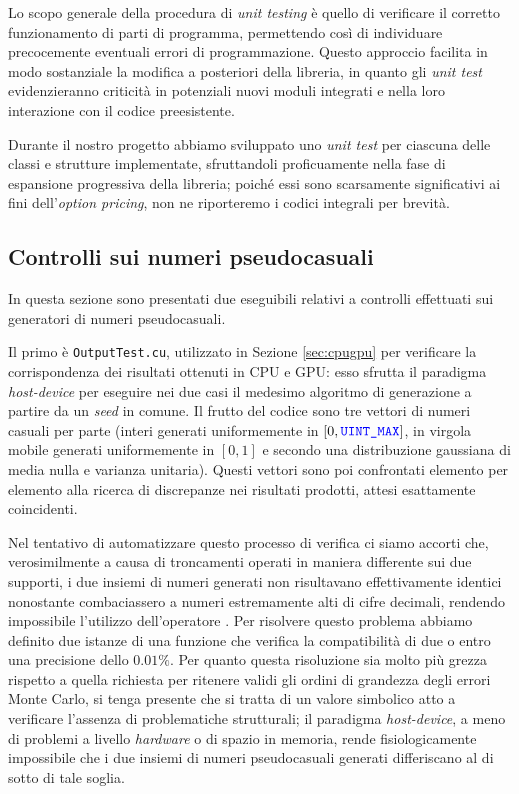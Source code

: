 Lo scopo generale della procedura di \textit{unit testing} è quello di verificare il corretto funzionamento di parti di programma, permettendo così di individuare precocemente eventuali errori di programmazione. Questo approccio facilita in modo sostanziale la modifica a posteriori della libreria, in quanto gli \textit{unit test} evidenzieranno criticità in potenziali nuovi moduli integrati e nella loro interazione con il codice preesistente.

Durante il nostro progetto abbiamo sviluppato uno \textit{unit test} per ciascuna delle classi e strutture implementate, sfruttandoli proficuamente nella fase di espansione progressiva della libreria; poiché essi sono scarsamente significativi ai fini dell'\textit{option pricing}, non ne riporteremo i codici integrali per brevità.

\subsection{Controlli sui numeri pseudocasuali}
In questa sezione sono presentati due eseguibili relativi a controlli effettuati sui generatori di numeri pseudocasuali.

Il primo è \verb|OutputTest.cu|, utilizzato in Sezione \ref{sec:cpugpu} per verificare la corrispondenza dei risultati ottenuti in CPU e GPU: esso sfrutta il paradigma \textit{host-device} per eseguire nei due casi il medesimo algoritmo di generazione a partire da un \textit{seed} in comune. Il frutto del codice sono tre vettori di numeri casuali per parte (interi generati uniformemente in $[0,\codeword{UINT_MAX}]$, in virgola mobile generati uniformemente in $[0,1]$ e secondo una distribuzione gaussiana di media nulla e varianza unitaria). Questi vettori sono poi confrontati elemento per elemento alla ricerca di discrepanze nei risultati prodotti, attesi esattamente coincidenti.

Nel tentativo di automatizzare questo processo di verifica ci siamo accorti che, verosimilmente a causa di troncamenti operati in maniera differente sui due supporti, i due insiemi di numeri generati non risultavano effettivamente identici nonostante combaciassero a numeri estremamente alti di cifre decimali, rendendo impossibile l'utilizzo dell'operatore \codeword{==}. Per risolvere questo problema abbiamo definito due istanze di una funzione  che verifica la compatibilità di due  o  entro una precisione dello $0.01\%$. Per quanto questa risoluzione sia molto più grezza rispetto a quella richiesta per ritenere validi gli ordini di grandezza degli errori Monte Carlo, si tenga presente che si tratta di un valore simbolico atto a verificare l'assenza di problematiche strutturali; il paradigma \textit{host-device}, a meno di problemi a livello \textit{hardware} o di spazio in memoria, rende fisiologicamente impossibile che i due insiemi di numeri pseudocasuali generati differiscano al di sotto di tale soglia.

